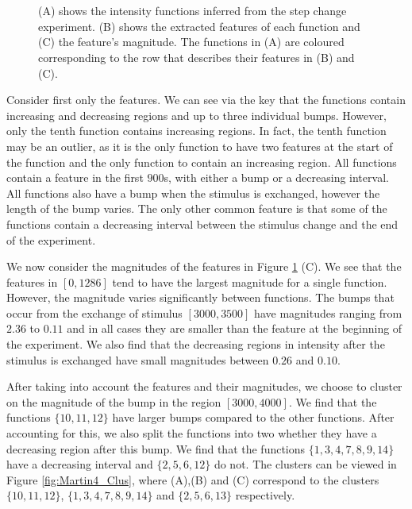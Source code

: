 \documentclass[../main.tex]{subfiles}
\begin{document}
 \begin{figure}[t!]
   \hrulefill
   \begin{center} 
     \\
       \\
    \end{center}     
    \caption{(A) shows the intensity functions inferred from the step change experiment. (B) shows the extracted features of each function and (C) the feature's magnitude. The functions in (A) are coloured corresponding to the row that describes their features in (B) and (C).}
     \label{fig:Martin4}
    \hrulefill
    \end{figure}

Consider first only the features. We can see via the key that the functions contain increasing and decreasing regions and up to three individual bumps. However, only the tenth function contains increasing regions. In fact, the tenth function may be an outlier, as it is the only function to have two features at the start of the function and the only function to contain an increasing region.  All functions contain a feature in the first $900$s, with either a bump or a decreasing interval. All functions also have a bump when the stimulus is exchanged, however the length of the bump varies. The only other common feature is that some of the functions contain a decreasing interval between the stimulus change and the end of the experiment.

We now consider the magnitudes of the features in Figure \ref{fig:Martin4} (C). We see that the features in $[0,1286]$ tend to have the largest magnitude for a single function. However, the magnitude varies significantly between functions. The bumps that occur from the exchange of stimulus $[3000,3500]$ have magnitudes ranging from $2.36$ to $0.11$ and in all cases they are smaller than the feature at the beginning of the experiment. We also find that the decreasing regions in intensity after the stimulus is exchanged have small magnitudes between $0.26$ and $0.10$. 


After taking into account the features and their magnitudes, we choose to cluster on the magnitude of the bump in the region $[3000,4000]$. We find that the functions $\{10,11,12\}$ have larger bumps compared to the other functions. After accounting for this, we also split the functions into two whether they have a decreasing region after this bump. We find that the functions $\{1,3,4,7,8,9,14\}$ have a decreasing interval and $\{2,5,6,12\}$ do not.   The clusters can be viewed in Figure \ref{fig:Martin4_Clus}, where (A),(B) and (C) correspond to the clusters $\{10,11,12\}$, $\{1,3,4,7,8,9,14\}$ and $\{2,5,6,13\}$ respectively. 
\end{document}
